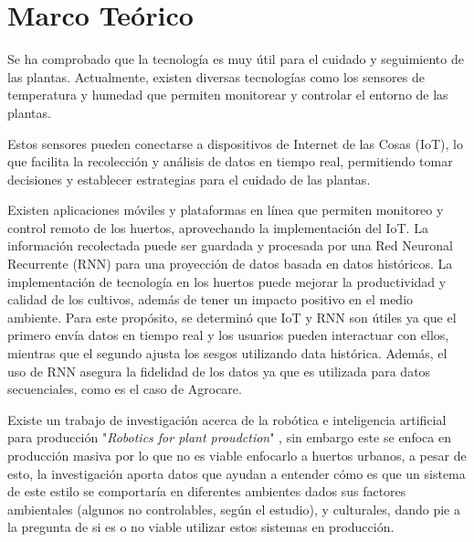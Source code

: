 \section{Marco Teórico}

Se ha comprobado que la tecnología es muy útil para el cuidado y seguimiento de las plantas. Actualmente, existen diversas tecnologías como los sensores de temperatura y humedad que permiten monitorear y controlar el entorno de las plantas.
\vspace{0.5cm}

Estos sensores pueden conectarse a dispositivos de Internet de las Cosas (IoT), lo que facilita la recolección y análisis de datos en tiempo real, permitiendo tomar decisiones y establecer estrategias para el cuidado de las plantas.
\vspace{0.5cm}

Existen aplicaciones móviles y plataformas en línea que permiten monitoreo y control remoto de los huertos, aprovechando la implementación del IoT. La información recolectada puede ser guardada y procesada por una Red Neuronal Recurrente (RNN) para una proyección de datos basada en datos históricos. La implementación de tecnología en los huertos puede mejorar la productividad y calidad de los cultivos, además de tener un impacto positivo en el medio ambiente. Para este propósito, se determinó que IoT y RNN son útiles ya que el primero envía datos en tiempo real y los usuarios pueden interactuar con ellos, mientras que el segundo ajusta los sesgos utilizando data histórica. Además, el uso de RNN asegura la fidelidad de los datos ya que es utilizada para datos secuenciales, como es el caso de Agrocare.
\vspace{0.5cm}

Existe un trabajo de investigación acerca de la robótica e inteligencia artificial para producción "\textit{Robotics for plant proudction}" \citep{robotics_for_plant_production}, sin embargo este se enfoca en producción masiva por lo que no es viable enfocarlo a huertos urbanos, a pesar de esto, la investigación aporta datos que ayudan a entender cómo es que un sistema de este estilo se comportaría en diferentes ambientes dados sus factores ambientales (algunos no controlables, según el estudio), y culturales, dando pie a la pregunta de si es o no viable utilizar estos sistemas en producción.